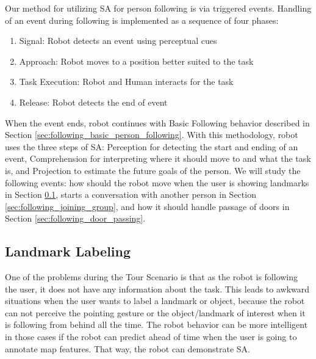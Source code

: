 \documentclass[12pt]{gatech-thesis}
\begin{document}
Our method for utilizing SA for person following is via triggered events. Handling of an event during following is implemented as a sequence of four phases:

\begin{enumerate}
\item Signal: Robot detects an event using perceptual cues
\item Approach: Robot moves to a position better suited to the task
\item Task Execution: Robot and Human interacts for the task
\item Release: Robot detects the end of event
\end{enumerate}

When the event ends, robot continues with Basic Following behavior described in Section \ref{sec:following_basic_person_following}. With this methodology, robot uses the three steps of SA: Perception for detecting the start and ending of an event, Comprehension for interpreting where it should move to and what the task is, and Projection to estimate the future goals of the person. We will study the following events: how should the robot move when the user is showing landmarks in Section \ref{sec:following_landmark_labeling}, starts a conversation with another person in Section \ref{sec:following_joining_group}, and how it should handle passage of doors in Section \ref{sec:following_door_passing}.





\subsection{Landmark Labeling}
\label{sec:following_landmark_labeling}


One of the problems during the Tour Scenario is that as the robot is following the user, it does not have any information about the task. This leads to awkward situations when the user wants to label a landmark or object, because the robot can not perceive the pointing gesture or the object/landmark of interest when it is following from behind all the time. The robot behavior can be more intelligent in those cases if the robot can predict ahead of time when the user is going to annotate map features. That way, the robot can demonstrate SA.
\end{document}
